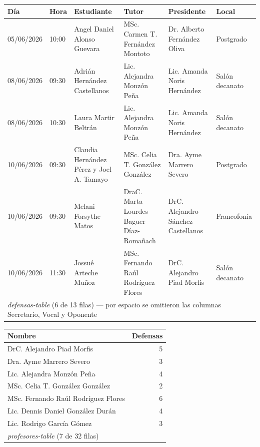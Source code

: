 \documentclass[12pt,a4paper]{report}
\begin{document}
\noindent\hspace*{-2cm}
\renewcommand{\arraystretch}{1.25}
\begin{tabular}{llllll}
\toprule
\textbf{Día} & \textbf{Hora} & \textbf{Estudiante} & \textbf{Tutor} &
\textbf{Presidente} & \textbf{Local} \\
\midrule
05/06/2026 & 10:00
  & Angel Daniel Alonso Guevara
  & MSc. Carmen T. Fernández Montoto
  & Dr. Alberto Fernández Oliva
  & Postgrado \\
08/06/2026 & 09:30
  & Adrián Hernández Castellanos
  & Lic. Alejandra Monzón Peña
  & Lic. Amanda Noris Hernández
  & Salón decanato \\
08/06/2026 & 10:30
  & Laura Martir Beltrán
  & Lic. Alejandra Monzón Peña
  & Lic. Amanda Noris Hernández
  & Salón decanato \\
10/06/2026 & 09:30
  & Claudia Hernández Pérez y Joel A. Tamayo
  & MSc. Celia T. González González
  & Dra. Ayme Marrero Severo
  & Postgrado \\
10/06/2026 & 09:30
  & Melani Forsythe Matos
  & DraC. Marta Lourdes Baguer Díaz-Romañach
  & DrC. Alejandro Sánchez Castellanos
  & Francofonía \\
10/06/2026 & 11:30
  & Jossué Arteche Muñoz
  & MSc. Fernando Raúl Rodríguez Flores
  & DrC. Alejandro Piad Morfis
  & Salón decanato \\
\bottomrule
\multicolumn{6}{l}{\scriptsize\textit{defensas-table} (6 de 13 filas) —
                     por espacio se omitieron las columnas
                     Secretario, Vocal y Oponente} \\
\end{tabular}


\begin{center}
\renewcommand{\arraystretch}{1.15}
\begin{tabular}{lr}
\toprule
\textbf{Nombre} & \textbf{Defensas} \\
\midrule
DrC. Alejandro Piad Morfis               & 5 \\
Dra. Ayme Marrero Severo                 & 3 \\
Lic. Alejandra Monzón Peña               & 4 \\
MSc. Celia T. González González          & 2 \\
MSc. Fernando Raúl Rodríguez Flores       & 6 \\
Lic. Dennis Daniel González Durán        & 4 \\
Lic. Rodrigo García Gómez                & 3 \\
\bottomrule
\multicolumn{2}{l}{\scriptsize\textit{profesores-table} (7 de 32 filas)} \\
\end{tabular}
\end{center}
\end{document}
